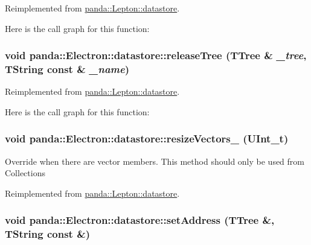 Reimplemented from \hyperlink{structpanda_1_1Lepton_1_1datastore_a44602d14a45e9a23ffdb02f9dfa7e018}{panda::Lepton::datastore}.

Here is the call graph for this function:\hypertarget{structpanda_1_1Electron_1_1datastore_acd47db6bdd5b2308f4f1b02a9b1bd97f}{
\subsubsection[{releaseTree}]{\setlength{\rightskip}{0pt plus 5cm}void panda::Electron::datastore::releaseTree (TTree \& {\em \_\-tree}, \/  TString const \& {\em \_\-name})}}
\label{structpanda_1_1Electron_1_1datastore_acd47db6bdd5b2308f4f1b02a9b1bd97f}


Reimplemented from \hyperlink{structpanda_1_1Lepton_1_1datastore_a3288e551dbce7062e6f2e4e88f1a6a40}{panda::Lepton::datastore}.

Here is the call graph for this function:\hypertarget{structpanda_1_1Electron_1_1datastore_a8f0e7ee31635f5cf7482c86b732877a2}{
\subsubsection[{resizeVectors\_\-}]{\setlength{\rightskip}{0pt plus 5cm}void panda::Electron::datastore::resizeVectors\_\- (UInt\_\-t)}}
\label{structpanda_1_1Electron_1_1datastore_a8f0e7ee31635f5cf7482c86b732877a2}


Override when there are vector members. This method should only be used from Collections 

Reimplemented from \hyperlink{structpanda_1_1Lepton_1_1datastore_ae0167ad568d7b57d6e11b1775cd790c7}{panda::Lepton::datastore}.\hypertarget{structpanda_1_1Electron_1_1datastore_a71a4b440953afe1b0252d462753b74f1}{
\subsubsection[{setAddress}]{\setlength{\rightskip}{0pt plus 5cm}void panda::Electron::datastore::setAddress (TTree \&, \/  TString const \&)}}
\label{structpanda_1_1Electron_1_1datastore_a71a4b440953afe1b0252d462753b74f1}


